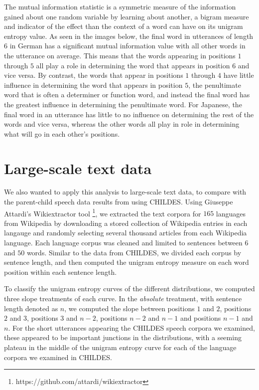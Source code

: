\documentclass[10pt, letterpaper]{article}
\begin{document}
The mutual information statistic is a symmetric measure of the
information gained about one random variable by learning about another,
a bigram measure and indicator of the effect than the context of a word
can have on its unigram entropy value. As seen in the images below, the
final word in utterances of length \(6\) in German has a significant
mutual information value with all other words in the utterance on
average. This means that the words appearing in positions \(1\) through
\(5\) all play a role in determining the word that appears in position
\(6\) and vice versa. By contrast, the words that appear in positions
\(1\) through \(4\) have little influence in determining the word that
appears in position \(5\), the penultimate word that is often a
determiner or function word, and instead the final word has the greatest
influence in determining the penultimate word. For Japanese, the final
word in an utterance has little to no influence on determining the rest
of the words and vice versa, whereas the other words all play in role in
determining what will go in each other's positions.

\section{Large-scale text data}\label{large-scale-text-data}

We also wanted to apply this analysis to large-scale text data, to
compare with the parent-child speech data results from using CHILDES.
Using Giuseppe Attardi's Wikiextractor tool
\footnote{https://github.com/attardi/wikiextractor}, we extracted the
text corpora for \(165\) languages from Wikipedia by downloading a
stored collection of Wikipedia entries in each langauge and randomly
selecting several thousand articles from each Wikipedia language. Each
language corpus was cleaned and limited to sentences between \(6\) and
\(50\) words. Similar to the data from CHILDES, we divided each corpus
by sentence length, and then computed the unigram entropy measure on
each word position within each sentence length.

To classify the unigram entropy curves of the different distributions,
we computed three slope treatments of each curve. In the \emph{absolute}
treatment, with sentence length denoted as \(n\), we computed the slope
between positions \(1\) and \(2\), positions \(2\) and \(3\), positions
\(3\) and \(n-2\), positions \(n-2\) and \(n-1\) and positions \(n-1\)
and \(n\). For the short utterances appearing the CHILDES speech corpora
we examined, these appeared to be important junctions in the
distributions, with a seeming plateau in the middle of the unigram
entropy curve for each of the language corpora we examined in CHILDES.
\end{document}

